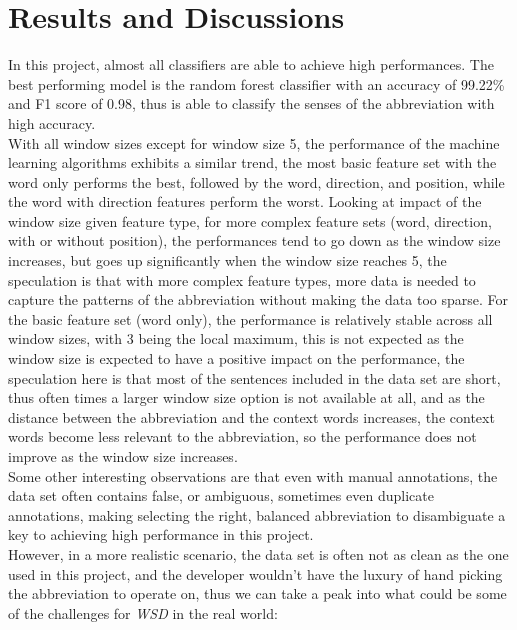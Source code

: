 \documentclass{article}
\begin{document}
    \section{Results and Discussions}
    In this project, almost all classifiers are able to achieve high performances. The best performing model is the random forest classifier with an accuracy of 99.22\% and F1 score of 0.98, thus is able to classify the senses of the abbreviation with high accuracy.\\
    With all window sizes except for window size 5, the performance of the machine learning algorithms exhibits a similar trend, the most basic feature set with the word only performs the best, followed by the word, direction, and position, while the word with direction features perform the worst. Looking at impact of the window size given feature type, for more complex feature sets (word, direction, with or without position), the performances tend to go down as the window size increases, but goes up significantly when the window size reaches 5, the speculation is that with more complex feature types, more data is needed to capture the patterns of the abbreviation without making the data too sparse. For the basic feature set (word only), the performance is relatively stable across all window sizes, with 3 being the local maximum, this is not expected as the window size is expected to have a positive impact on the performance, the speculation here is that most of the sentences included in the data set are short, thus often times a larger window size option is not available at all, and as the distance between the abbreviation and the context words increases, the context words become less relevant to the abbreviation, so the performance does not improve as the window size increases.\\
    Some other interesting observations are that even with manual annotations, the data set often contains false, or ambiguous, sometimes even duplicate annotations, making selecting the right, balanced abbreviation to disambiguate a key to achieving high performance in this project. \\
    However, in a more realistic scenario, the data set is often not as clean as the one used in this project, and the developer wouldn't have the luxury of hand picking the abbreviation to operate on, thus we can take a peak into what could be some of the challenges for \textit{WSD} in the real world:
\end{document}
